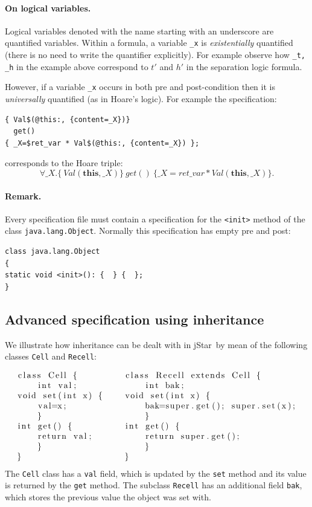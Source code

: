 \documentclass[11pt]{article}
\newcommand{\jStar}{{\sf jStar}}
\newcommand{\this}{\mathbf{this}}
\def\J{\lstinline}
\begin{document}
\paragraph{On logical variables.}
Logical variables denoted with the name starting with an underscore
are quantified variables.  Within a formula, a variable  {\tt \_x} is {\em existentially}
quantified (there is no need to write the quantifier explicitly). For example observe how {\tt \_t, \_h} in the example above  correspond to $t'$ and $h'$ in the separation logic formula.

However, if a variable {\tt \_x}
occurs in both pre and post-condition then it is {\em universally}
quantified (as in Hoare's logic). For example the specification:
\begin{verbatim}
{ Val$(@this:, {content=_X})} 
  get()
{ _X=$ret_var * Val$(@this:, {content=_X}) };
\end{verbatim}
corresponds to the Hoare triple:
\[
\forall \_X. \{ \ Val(\this,\_X) \} \ get() \ \{ \_X=ret\_var *  Val(\this, \_X)\}.
\]


\paragraph{Remark.} 
Every specification file must contain a specification for the {\tt <init>} method of the class {\tt java.lang.Object}. Normally this specification has empty pre and post:
\begin{verbatim}
class java.lang.Object 
{
static void <init>(): {  } {  };
}
\end{verbatim}

\subsection{Advanced specification using inheritance}
\label{sec:inheritance}
We illustrate how inheritance can be dealt with in \jStar \ by mean of the following classes
\J~Cell~ and \J~Recell~:
\[\begin{tabular}{@{}ll@{}}\begin{lstlisting}
class Cell {
    int val;

    void set(int x) {
	val=x;
    }

    int get() {
	return val;
    }
}
\end{lstlisting}&\hspace{1em}
\begin{lstlisting}
class Recell extends Cell {
    int bak;

    void set(int x) {
	bak=super.get(); super.set(x);
    }

    int get() {
	return super.get();
    }
}
\end{lstlisting}
\end{tabular}
\]
The \J~Cell~ class has a \J~val~ field, which is updated by the
\J~set~ method and its value is returned by the \J~get~ method.  The
subclass \J~Recell~ has an additional field \J~bak~, which stores the
previous value the object was set with. 
\end{document}
